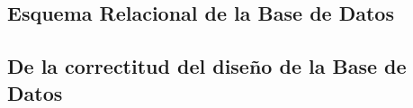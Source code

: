 \documentclass{article}
\begin{document}
\subsection{Esquema Relacional de la Base de Datos}

\subsection{De la correctitud del diseño de la Base de Datos}
\end{document}
